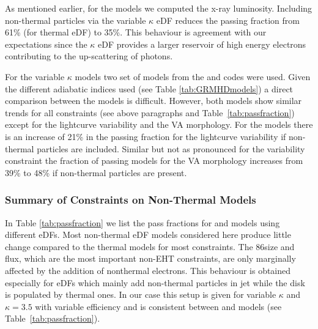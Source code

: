 As mentioned earlier, for the \hamr models we computed the x-ray luminosity.
Including non-thermal particles via the variable $\kappa$ eDF reduces the passing fraction from 61\% (for thermal eDF) to 35\%.
This behaviour is agreement with our expectations since the $\kappa$ eDF provides a larger reservoir of high energy electrons contributing to the up-scattering of photons.


For the variable $\kappa$ models two set of models from the \bhac and \hamr codes were used.
Given the different adiabatic indices used (see Table \ref{tab:GRMHDmodels}) a direct comparison between the models is difficult.
However, both models show similar trends for all constraints (see above paragraphs and Table~\ref{tab:passfraction}) except for the lightcurve variability and the VA morphology.
For the \hamr models there is an increase of 21\% in the passing fraction for the lightcurve variability if non-thermal particles are included.
Similar but not as pronounced for the variability constraint the fraction of passing models for the VA morphology increases from 39\% to 48\% if non-thermal particles are present.

\subsubsection{Summary of Constraints on Non-Thermal Models}



In Table \ref{tab:passfraction} we list the pass fractions for \bhac and \hamr models using different eDFs.
Most non-thermal eDF models considered here produce little change compared to the thermal models for most constraints.
The 86\GHz size and flux, which are the most important non-EHT constraints, are only marginally affected by the addition of nonthermal electrons.
This behaviour is obtained especially for eDFs which mainly add non-thermal particles in jet while the disk is populated by thermal ones.
In our case this setup is given for variable $\kappa$ and $\kappa=3.5$ with variable efficiency and is consistent between \bhac and \hamr models (see Table~\ref{tab:passfraction}).

